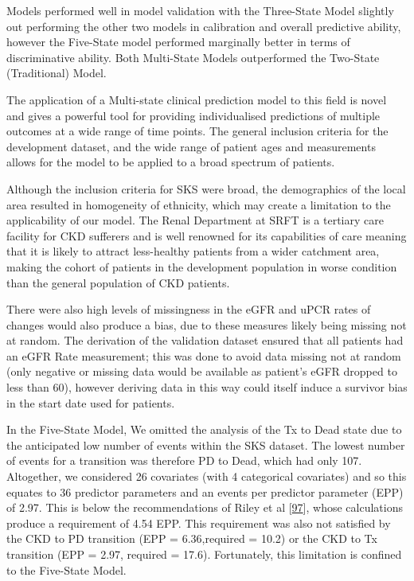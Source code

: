 \documentclass[12pt,PhD,twoside,openright]{muthesis}
\begin{document}
Models performed well in model validation with the Three-State Model slightly out performing the other two models in calibration and overall predictive ability, however the Five-State model performed marginally better in terms of discriminative ability. Both Multi-State Models outperformed the Two-State (Traditional) Model.

The application of a Multi-state clinical prediction model to this field is novel and gives a powerful tool for providing individualised predictions of multiple outcomes at a wide range of time points. The general inclusion criteria for the development dataset, and the wide range of patient ages and measurements allows for the model to be applied to a broad spectrum of patients.

Although the inclusion criteria for SKS were broad, the demographics of the local area resulted in homogeneity of ethnicity, which may create a limitation to the applicability of our model. The Renal Department at SRFT is a tertiary care facility for CKD sufferers and is well renowned for its capabilities of care meaning that it is likely to attract less-healthy patients from a wider catchment area, making the cohort of patients in the development population in worse condition than the general population of CKD patients.

There were also high levels of missingness in the eGFR and uPCR rates of changes would also produce a bias, due to these measures likely being missing not at random. The derivation of the validation dataset ensured that all patients had an eGFR Rate measurement; this was done to avoid data missing not at random (only negative or missing data would be available as patient's eGFR dropped to less than 60), however deriving data in this way could itself induce a survivor bias in the start date used for patients.

In the Five-State Model, We omitted the analysis of the Tx to Dead state due to the anticipated low number of events within the SKS dataset. The lowest number of events for a transition was therefore PD to Dead, which had only 107. Altogether, we considered 26 covariates (with 4 categorical covariates) and so this equates to 36 predictor parameters and an events per predictor parameter (EPP) of 2.97. This is below the recommendations of Riley et al {[}\protect\hyperlink{ref-riley_minimum_2019}{97}{]}, whose calculations produce a requirement of 4.54 EPP. This requirement was also not satisfied by the CKD to PD transition (EPP = 6.36,required = 10.2) or the CKD to Tx transition (EPP = 2.97, required = 17.6). Fortunately, this limitation is confined to the Five-State Model.
\end{document}
